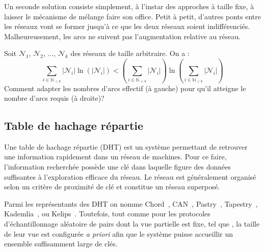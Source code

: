 Un seconde solution consiste simplement, à l'instar des approches à taille fixe,
à laisser le mécanisme de mélange faire son office. Petit à petit, d'autres
ponts entre les réseaux vont se former jusqu'à ce que les deux réseaux soient
indifférenciés. Malheureusement, les arcs ne suivent pas l'augmentation relative
au réseau.

\begin{problem}
  Soit $\mathcal{N}_1,\, \mathcal{N}_2,\, \ldots ,\, \mathcal{N}_k$ des réseaux
  de taille arbitraire. On a :
\begin{equation}
  \sum\limits_{i \in \mathbb{N}_{<k}} |\mathcal{N}_i|\ln (|\mathcal{N}_i|) < (\sum\limits_{i \in \mathbb{N}_{<k}} |\mathcal{N}_i|)\ln{(\sum\limits_{i \in \mathbb{N}_{<k}} |\mathcal{N}_i|)}
\end{equation}
Comment adapter les nombres d'arcs effectif (à gauche) pour qu'il atteigne le
nombre d'arcs requis (à droite)?
\end{problem}



\subsection{Table de hachage répartie}

Une table de hachage répartie (DHT) est un système permettant de retrouver une
information rapidement dans un réseau de machines. Pour ce faire, l'information
recherchée possède une clé dans laquelle figure des données suffisantes à
l'exploration efficace du réseau. Le réseau est généralement organisé selon un
critère de proximité de clé et constitue un réseau superposé. 

Parmi les représentants des DHT on nomme Chord~\cite{stoica2001chord},
CAN~\cite{ratnasamy2001scalable}, Pastry~\cite{rowstron2001pastry},
Tapestry~\cite{zhao2006tapestry}, Kademlia~\cite{maymounkov2002kademlia}, ou
Kelips~\cite{gupta2003kelips}.   Toutefois, tout comme pour les
protocoles d'échantillonnage aléatoire de pairs dont la vue partielle est fixe,
tel que \CYCLON, la taille de leur vue est configurée \emph{a priori} afin que
le système puisse accueillir un ensemble suffisamment large de clés.

